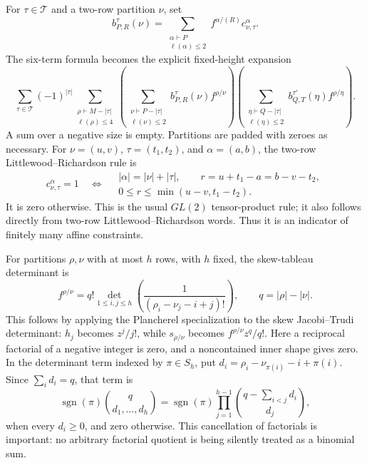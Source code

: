 \documentclass[11pt,letterpaper]{article}
\theoremstyle{remark}\newtheorem{remark}[theorem]{Remark}
\numberwithin{equation}{section}
\newcommand{\Tset}{\mathcal T}
\begin{document}
For $\tau\in\Tset$ and a two-row partition $\nu$, set
\begin{equation}\label{upo:ex5:eq:bcoef}
 b_{P,R}^{\tau}(\nu)
 =\sum_{\substack{\alpha\vdash P\\\ell(\alpha)\le2}}
   f^{\alpha/(R)}c^\alpha_{\nu,\tau}.
\end{equation}
The six-term formula becomes the explicit fixed-height expansion
\begin{equation}\label{upo:ex5:eq:expanded}
 \sum_{\tau\in\Tset}(-1)^{|\tau|}
 \sum_{\substack{\rho\vdash M-|\tau|\\\ell(\rho)\le4}}
 \left(\sum_{\substack{\nu\vdash P-|\tau|\\\ell(\nu)\le2}}
       b_{P,R}^{\tau}(\nu)f^{\rho/\nu}\right)
 \left(\sum_{\substack{\eta\vdash Q-|\tau|\\\ell(\eta)\le2}}
       b_{Q,T}^{\tau'}(\eta)f^{\rho/\eta}\right).
\end{equation}
A sum over a negative size is empty. Partitions are padded with zeroes
as necessary. For $\nu=(u,v)$, $\tau=(t_1,t_2)$, and
$\alpha=(a,b)$, the two-row Littlewood--Richardson rule is
\begin{equation}\label{upo:ex5:eq:LR2}
 c^\alpha_{\nu,\tau}=1
 \quad\Longleftrightarrow\quad
 \begin{gathered}
 |\alpha|=|\nu|+|\tau|,\qquad
 r=u+t_1-a=b-v-t_2,\\
 0\le r\le\min(u-v,t_1-t_2).
 \end{gathered}
\end{equation}
It is zero otherwise. This is the usual $GL(2)$ tensor-product
rule; it also follows directly from two-row Littlewood--Richardson
words. Thus it is an indicator of finitely many affine constraints.

For partitions $\rho,\nu$ with at most $h$ rows, with $h$ fixed,
the skew-tableau determinant is
\begin{equation}\label{upo:ex5:eq:det}
 f^{\rho/\nu}=q!\det_{1\le i,j\le h}
          \left(\frac{1}{(\rho_i-\nu_j-i+j)!}\right),
 \qquad q=|\rho|-|\nu|.
\end{equation}
This follows by applying the Plancherel specialization to the
skew Jacobi--Trudi determinant: $h_j$ becomes $z^j/j!$, while
$s_{\rho/\nu}$ becomes $f^{\rho/\nu}z^q/q!$.
Here a reciprocal factorial of a negative integer is zero, and a
noncontained inner shape gives zero. In the determinant term
indexed by $\pi\in S_h$, put
$d_i=\rho_i-\nu_{\pi(i)}-i+\pi(i)$. Since $\sum_i d_i=q$,
that term is
\begin{equation}\label{upo:ex5:eq:multinomial}
 \operatorname{sgn}(\pi)\binom{q}{d_1,\ldots,d_h}
 =\operatorname{sgn}(\pi)
   \prod_{j=1}^{h-1}\binom{q-\sum_{i<j}d_i}{d_j},
\end{equation}
when every $d_i\ge0$, and zero otherwise. This cancellation of
factorials is important: no arbitrary factorial quotient is being
silently treated as a binomial sum.
\end{document}
